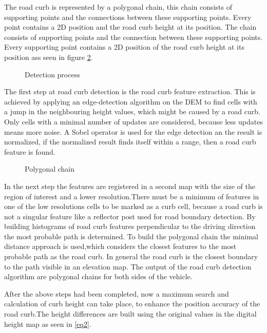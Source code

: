 \documentclass[conference]{IEEEtran}
\begin{document}
The road curb is represented by a polygonal chain, this chain consists of supporting points and the connections between these supporting points. Every point contains a 2D position and the road curb height at its position. The chain consists of supporting points and the connection between these supporting points. Every supporting point contains a 2D position of the road curb height at its position ass seen in figure \ref{fig7}. 


\begin{figure}[ht]
	\centering
	\caption{Detection process}
	\label{fig8}
\end{figure}



The first step at road curb detection is the road curb feature extraction. This is achieved by applying an edge-detection algorithm on the DEM to find cells with a jump in the neighbouring height values, which might be caused by a road curb. Only cells with a minimal number of updates are considered, because less updates means more noise. A Sobel operator is used for the edge detection an the result is normalized, if the normalized result finds itself within a range, then a road curb feature is found. 



\begin{figure}[ht]
	\centering
	\caption{Polygonal chain}
	\label{fig7}
\end{figure}


In the next step the features are registered in a second map with the size of the region of interest and a lower resolution.There must be a minimum of features in one of the low resolutions cells to be marked as a curb cell, because a road curb is not a singular feature like a reflector post used for road boundary detection. By building histograms of road curb features perpendicular to the driving direction the most probable path is determined. To build the polygonal chain the minimal distance approach is used,which considers the closest features to the most probable path as the road curb. In general the road curb is the closest boundary to the path visible in an elevation map. The output of the road curb detection algorithm are polygonal chains for both sides of the vehicle.

After the above steps had been completed, now a maximum search and calculation of curb height can take place, to enhance the position accuracy of the road curb.The height differences are built using the original values in the digital height map as seen in \ref{eq2}.
\end{document}
